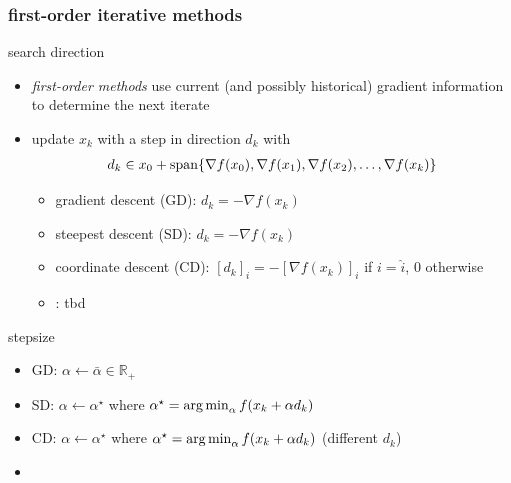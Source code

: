 \documentclass[10pt,dvipsnames*]{beamer}
\begin{document}
\begin{frame}
  \frametitle{first-order iterative methods}
  \begin{block}{search direction}
    \begin{itemize}
      \item \textit{first-order methods} use current (and possibly historical) gradient information to determine the next iterate
      \item update $x_k$ with a step in direction $d_k$ with
      \begin{align}
        d_k \in x_0 + \operatorname{span} \{\nabla f(x_0), \nabla f(x_1), \nabla f(x_2), \ldots, \nabla f(x_{k})\}
      \end{align}
      \vspace{-0.15cm}
      \begin{itemize}
        \item gradient descent (GD): $d_k = -\nabla f(x_k)$
        \item steepest descent (SD): $d_k = -\nabla f(x_k)$
        \item coordinate descent (CD): $[d_k]_{i} = -[\nabla f(x_k)]_{i}$ if $i = \hat{i}$, 0 otherwise
        \item {}: tbd
      \end{itemize}
    \end{itemize}
  \end{block}
  \begin{block}{stepsize}
    \begin{itemize}
      \item GD: $\alpha \gets \bar{\alpha} \in \mathbb{R}_+$
      \item SD: $\alpha \gets \alpha^{\star}$ where $\alpha^{\star} = \operatorname*{arg\,min}_{\alpha} f(x_k + \alpha d_k)$
      \item CD: $\alpha \gets \alpha^{\star}$ where $\alpha^{\star} = \operatorname*{arg\,min}_{\alpha} f(x_k + \alpha d_k)$ (different $d_k$)
      \item {}
    \end{itemize}
  \end{block}
\end{frame}
%
\end{document}

